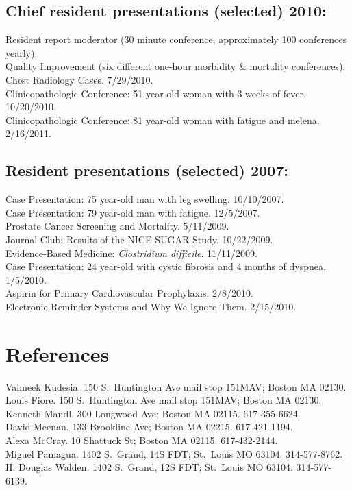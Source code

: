 \documentclass[12pt]{article}
\begin{document}
\subsection*{Chief resident presentations (selected) 2010:}
Resident report moderator (30 minute conference, approximately 100
conferences yearly).\\
Quality Improvement (six different one-hour morbidity \& mortality
conferences).\\
Chest Radiology Cases. 7/29/2010.\\
Clinicopathologic Conference: 51 year-old woman with 3 weeks of fever.
10/20/2010.\\
Clinicopathologic Conference: 81 year-old woman with fatigue and
melena. 2/16/2011.

\subsection*{Resident presentations (selected) 2007:}
Case Presentation: 75 year-old man with leg swelling. 10/10/2007.\\
Case Presentation: 79 year-old man with fatigue. 12/5/2007.\\
Prostate Cancer Screening and Mortality. 5/11/2009.\\
Journal Club: Results of the NICE-SUGAR Study. 10/22/2009.\\
Evidence-Based Medicine: \emph{Clostridium difficile}. 11/11/2009.\\
Case Presentation: 24 year-old with cystic fibrosis and 4 months of
dyspnea. 1/5/2010.\\
Aspirin for Primary Cardiovascular Prophylaxis. 2/8/2010.\\
Electronic Reminder Systems and Why We Ignore Them. 2/15/2010.

\section*{References}
Valmeek Kudesia. 150 S.\ Huntington Ave mail stop 151MAV; Boston MA
02130.\\
Louis Fiore. 150 S.\ Huntington Ave mail stop 151MAV; Boston MA
02130.\\
Kenneth Mandl. 300 Longwood Ave; Boston MA 02115. 617-355-6624.\\
David Meenan. 133 Brookline Ave; Boston MA 02215. 617-421-1194.\\
Alexa McCray. 10 Shattuck St; Boston MA 02115. 617-432-2144.\\
Miguel Paniagua. 1402 S.\ Grand, 14S FDT; St.\ Louis MO 63104.
314-577-8762.\\
H. Douglas Walden. 1402 S.\ Grand, 12S FDT; St.\ Louis MO 63104.
314-577-6139.\\
\end{document}
